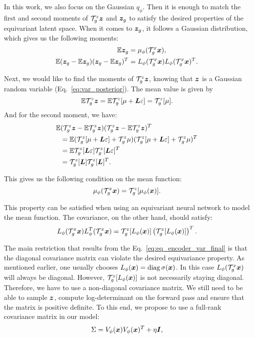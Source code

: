 In this work, we also focus on the Gaussian $q_{\phi}$. Then it is enough to match the first and second moments of ${\mathcal{T}}_g^z {\bm{z}}$ and ${\bm{z}}_g$ to satisfy the desired properties of the equivariant latent space. 
When it comes to ${\bm{z}}_g$, it follows a Gaussian distribution, which gives us the following moments: 
\begin{align}
    \mathbb{E} {\bm{z}}_g&= \mu_{\phi}({\mathcal{T}}_g^x {\bm{x}}), \\
    \mathbb{E}({\bm{z}}_g - \mathbb{E} {\bm{z}}_g) ({\bm{z}}_g - \mathbb{E} {\bm{z}}_g)^T &= L_{\phi}({\mathcal{T}}_g^x {\bm{x}})L_{\phi}({\mathcal{T}}_g^x {\bm{x}})^T.
\end{align}

Next, we would like to find the moments of ${\mathcal{T}}_g^z {\bm{z}}$, knowing that ${\bm{z}}$ is a Gaussian random variable (Eq.~\ref{eq:var_posterior}). The mean value is given by
\begin{equation}
    \mathbb{E} {\mathcal{T}}_g^z {\bm{z}} = \mathbb{E} {\mathcal{T}}_g^z[\mu + {\bm{L}}\varepsilon] =  {\mathcal{T}}_g^z[\mu].
\end{equation}
And for the second moment, we have:
\begin{align}
    \mathbb{E} &({\mathcal{T}}_g^z {\bm{z}} - \mathbb{E}  {\mathcal{T}}_g^z {\bm{z}})({\mathcal{T}}_g^z {\bm{z}} - \mathbb{E}  {\mathcal{T}}_g^z {\bm{z}} )^T \\
    &=\mathbb{E} ({\mathcal{T}}_g^z[\mu + {\bm{L}}\varepsilon] + {\mathcal{T}}_g^z \mu)({\mathcal{T}}_g^z[\mu + {\bm{L}}\varepsilon] + {\mathcal{T}}_g^z\mu)^T \\
    &=\mathbb{E} {\mathcal{T}}_g^z[{\bm{L}}\varepsilon]{\mathcal{T}}_g^z[{\bm{L}}\varepsilon]^T \\
    &={\mathcal{T}}_g^z[{\bm{L}}]{\mathcal{T}}_g^z[{\bm{L}}]^T.
\end{align}

This gives us the following condition on the mean function:
\begin{equation}\label{eq:eq_encoder_mean_final}
     \mu_{\phi}(\gT_g^x \vx) = \gT_g^z[\mu_{\phi}(\vx)].
\end{equation}

This property can be satisfied when using an equivariant neural network to model the mean function. The covariance, on the other hand, should satisfy:
\begin{equation}\label{eq:eq_encoder_var_final}
    L_{\phi}(\gT_g^x \vx)L_{\phi}^T(\gT_g^x \vx) = \mathcal{T}_g^z[L_{\phi}(\vx)] \left(\gT_g^z[L_{\phi}(\vx)]\right)^T.
\end{equation}

The main restriction that results from the Eq.~\ref{eq:eq_encoder_var_final} is that the diagonal covariance matrix can violate the desired equivariance property. As mentioned earlier, one usually chooses $L_{\phi}({\bm{x}}) = \operatorname{diag} \sigma({\bm{x}})$. In this case $L_{\phi}({\mathcal{T}}_g^x {\bm{x}})$ will always be diagonal. However, $\mathcal{T}_g^z[L_{\phi}({\bm{x}})]$ is not necessarily staying diagonal. Therefore, we have to use a non-diagonal covariance matrix. We still need to be able to sample ${\bm{z}}$, compute log-determinant on the forward pass and ensure that the matrix is positive definite. To this end, we propose to use a full-rank covariance matrix in our model:
\begin{equation}
    \Sigma = V_{\phi}({\bm{x}})V_{\phi}({\bm{x}})^T + \eta {\bm{I}},
\end{equation}

